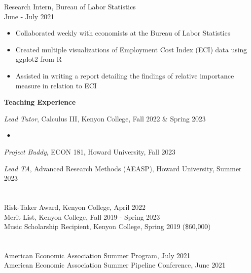 \documentclass[margin, 11pt]{res} %
\begin{document}
\begin{resume}
Research Intern, Bureau of Labor Statistics \\
June - July 2021
	\begin{itemize}
		\item Collaborated weekly with economists at the Bureau of Labor Statistics
		\item Created multiple visualizations of Employment Cost Index (ECI) data using ggplot2 from R
		\item Assisted in writing a report detailing the findings of relative importance measure in relation to ECI
	\end{itemize}
\textbf{Teaching Experience}

	\emph{Lead Tutor},  Calculus III, Kenyon College, Fall 2022 \& Spring 2023
		\begin{itemize}
			\item 
		\end{itemize}

	\emph{Project Buddy}, ECON 181, Howard University, Fall 2023

	\emph{Lead TA}, Advanced Research Methods (AEASP), Howard University, Summer 2023



\section{}
Risk-Taker Award, Kenyon College, April 2022 \\
Merit List, Kenyon College, Fall 2019 - Spring 2023 \\
Music Scholarship Recipient, Kenyon College, Spring 2019 (\$60,000) 


\section{}
American Economic Association Summer Program, July 2021 \\
American Economic Association Summer Pipeline Conference, June 2021 \\




\end{resume}
\end{document}

